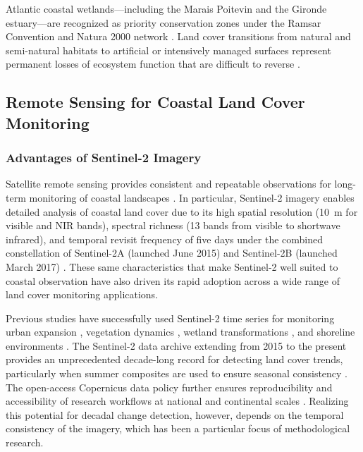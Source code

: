 \documentclass[coasts,article,accept,pdftex,moreauthors]{Definitions/mdpi}
\begin{document}
Atlantic coastal wetlands—including {the Marais Poitevin and the Gironde estuary}—are recognized as priority conservation zones under the Ramsar Convention and Natura 2000 network \citep{barnaud2011zones,fustec2000zones,triplet2014camargue}. Land cover transitions from natural and semi-natural habitats to artificial or intensively managed surfaces represent permanent losses of ecosystem function that are difficult to reverse \citep{meur-ferec2007artificialisation,deboudt2010littoral}.

\subsection{Remote Sensing for Coastal Land Cover Monitoring}

\subsubsection{Advantages of Sentinel-2 Imagery}

Satellite remote sensing provides consistent and repeatable observations for long-term monitoring of coastal landscapes \citep{Drusch2012}. In particular, Sentinel-2 imagery enables detailed analysis of coastal land cover due to its high spatial resolution (10~m for visible and NIR bands), spectral richness (13 bands from visible to shortwave infrared), and temporal revisit frequency of five days under the combined constellation of Sentinel-2A (launched June 2015) and Sentinel-2B (launched March 2017) \citep{MainKnornetal2017}. {These same characteristics that make Sentinel-2 well suited to coastal observation have also driven its rapid adoption across a wide range of land cover monitoring applications.}

Previous studies have successfully used Sentinel-2 time series for monitoring urban expansion \citep{pesaresi2016sentinel,soille2018urban}, vegetation dynamics \citep{Yancheng2024,BGDAG2024}, wetland transformations \citep{Cherian2024,Extraction2024}, and shoreline environments \citep{Review2025,castelle2021shoreline}. The Sentinel-2 data archive extending from 2015 to the present provides an unprecedented decade-long record for detecting land cover trends, particularly when summer composites are used to ensure seasonal consistency \citep{drusch2012sentinel,Inglada2015}. The open-access Copernicus data policy further ensures reproducibility and accessibility of research workflows at national and continental scales \citep{aschbacher2012copernicus}. {Realizing this potential for decadal change detection, however, depends on the temporal consistency of the imagery, which has been a particular focus of methodological research.}
\end{document}
